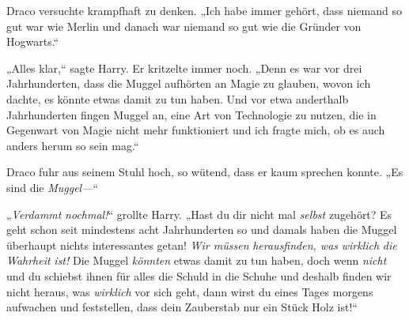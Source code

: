 Draco versuchte krampfhaft zu denken. „Ich habe immer gehört, dass niemand so gut war wie Merlin und danach war niemand so gut wie die Gründer von Hogwarts.“

„Alles klar,“ sagte Harry. Er kritzelte immer noch. „Denn es war vor drei Jahrhunderten, dass die Muggel aufhörten an Magie zu glauben, wovon ich dachte, es könnte etwas damit zu tun haben. Und vor etwa anderthalb Jahrhunderten fingen Muggel an, eine Art von Technologie zu nutzen, die in Gegenwart von Magie nicht mehr funktioniert und ich fragte mich, ob es auch anders herum so sein mag.“

Draco fuhr aus seinem Stuhl hoch, so wütend, dass er kaum sprechen konnte. „Es sind die \emph{Muggel—}“

„\emph{Verdammt} \emph{nochmal!}“ grollte Harry. „Hast du dir nicht mal \emph{selbst} zugehört? Es geht schon seit mindestens acht Jahrhunderten so und damals haben die Muggel überhaupt nichts interessantes getan! \emph{Wir müssen} \emph{herausfinden, was} \emph{wirklich} \emph{die} \emph{Wahrheit} \emph{ist!} Die Muggel \emph{könnten} etwas damit zu tun haben, doch wenn \emph{nicht} und du schiebst ihnen für alles die Schuld in die Schuhe und deshalb finden wir nicht heraus, was \emph{wirklich} vor sich geht, dann wirst du eines Tages morgens aufwachen und feststellen, dass dein Zauberstab nur ein Stück Holz ist!“

